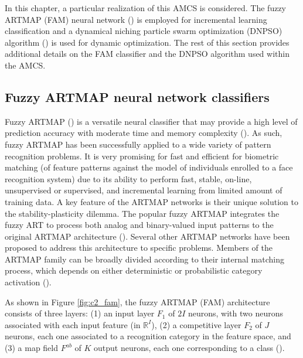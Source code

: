 In this chapter, a particular realization of this AMCS is considered.
The fuzzy ARTMAP (FAM) neural network (\cite{carpenter92}) is employed for incremental learning classification and a dynamical niching particle swarm optimization (DNPSO) algorithm (\cite{nickabadi08_2}) is used for dynamic optimization.
The rest of this section provides additional details on the FAM classifier and the DNPSO algorithm used within the AMCS.

\subsection{Fuzzy ARTMAP neural network classifiers}
\label{sec:c2_fam}

Fuzzy ARTMAP (\cite{carpenter91}) is a versatile neural classifier that may provide a high level of prediction accuracy with moderate time and memory complexity (\cite{granger07}).
As such, fuzzy ARTMAP has been successfully applied to a wide variety of pattern recognition problems.
It is very promising for fast and efficient for biometric matching (of feature patterns against the model of individuals enrolled to a face recognition system) due to its ability to perform fast, stable, on-line, unsupervised or supervised, and incremental learning from limited amount of training data. 
A key feature of the ARTMAP networks is their unique solution to the stability-plasticity dilemma.
The popular fuzzy ARTMAP integrates the fuzzy ART to process both analog and binary-valued input patterns to the original ARTMAP architecture (\cite{carpenter92}).
Several other ARTMAP networks have been proposed to address this architecture to specific problems.
Members of the ARTMAP family can be broadly divided according to their internal matching process, which depends on either deterministic or probabilistic category activation (\cite{connolly09}).

\begin{figure*}[!t]
  \centering
	\caption{Fuzzy ARTMAP neural network}
	\label{fig:c2_fam}
\end{figure*}

As shown in Figure \ref{fig:c2_fam}, the fuzzy ARTMAP (FAM) architecture consists of three layers: (1) an input layer $F_1$ of $2I$ neurons, with two neurons associated with each input feature (in $\mathbb{R}^I$), (2) a competitive layer $F_2$ of $J$ neurons, each one associated to a recognition category in the feature space, and (3) a map field $F^{ab}$ of $K$ output neurons, each one corresponding to a class (\cite{carpenter92}).

